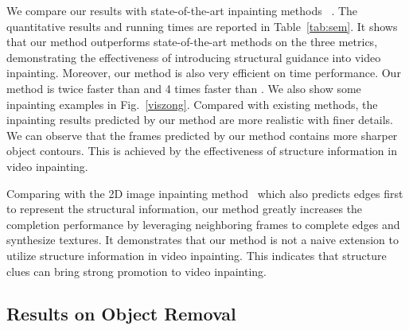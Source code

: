 We compare our results with state-of-the-art inpainting methods~\cite{nazeri2019edgeconnect,wang2019video,Kim_2019_CVPR1,Xu_2019_CVPR} . 
%
The quantitative results and running times are reported in Table~\ref{tab:sem}.
It shows that our method outperforms state-of-the-art methods on the three metrics, demonstrating the effectiveness of introducing structural guidance into video inpainting.
Moreover, our method is also very efficient on time performance. 
Our method is twice faster than \cite{Kim_2019_CVPR1} and 4 times faster than \cite{Xu_2019_CVPR}. 
%
We also show some inpainting examples in Fig.~\ref{viszong}.
Compared with existing methods, the inpainting results predicted by our method are more realistic with finer details. 
We can observe that the frames predicted by our method contains more sharper object contours. This is achieved by the effectiveness of structure information in video inpainting.
%




Comparing with the 2D image inpainting method~\cite{nazeri2019edgeconnect} which also predicts edges first to represent 
the structural information, our method greatly increases the completion performance by leveraging neighboring frames to complete edges and synthesize textures. 
%
It demonstrates that our method is not a naive extension to utilize structure information in video inpainting.
This indicates that structure clues can bring strong promotion to video inpainting.


 

%


\subsection{Results on Object Removal}



